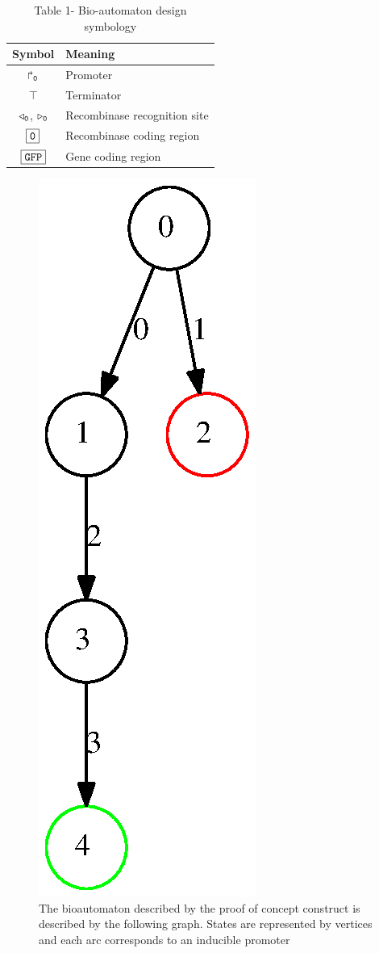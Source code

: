 \documentclass{article}
\newcommand{\prom}[1]{\Rsh_{\tt#1}}
\newcommand{\term}{\intercal}
\newcommand{\rrecsite}[1]{\triangleright_{\tt#1}}
\newcommand{\lrecsite}[1]{\triangleleft_{\tt#1}}
\newcommand{\gene}[1]{\framebox{\tt #1}}
\begin{document}
\begin{center}
\begin{table}
\centering
\begin{tabular}{| c | l|} 
\hline
Symbol & Meaning\\
\hline
$\prom{0}$ & Promoter\\
$\term$ & Terminator\\
$\lrecsite{0}$, $ \rrecsite{0}$ & Recombinase recognition site\\
$\gene{0}$ & Recombinase coding region\\
$\gene{GFP}$ & Gene coding region\\
\hline
\end{tabular}
\caption{Table 1- Bio-automaton design symbology}
\end{table}
\end{center}
\begin{figure} [h!]
\centering
\includegraphics{tree2.eps}
\caption{The bioautomaton described by the proof of concept construct is described by the following graph. States are represented by vertices and each arc corresponds to an inducible promoter}
\end{figure}
\end{document}
